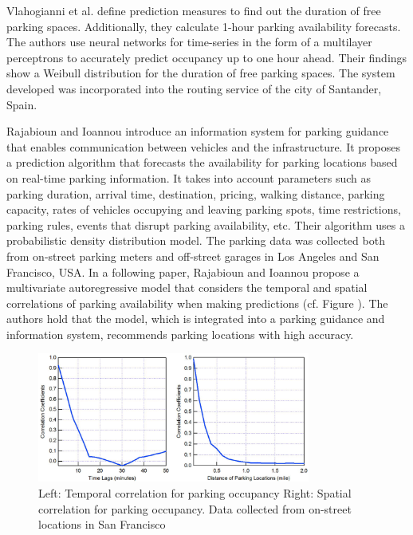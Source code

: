 Vlahogianni et al. \cite{vlahogianni} define prediction measures to find out the duration of free parking spaces. Additionally, they calculate 1-hour parking availability forecasts. The authors use neural networks for time-series in the form of a multilayer perceptrons to accurately predict occupancy up to one hour ahead. Their findings show a Weibull distribution for the duration of free parking spaces. The system developed was incorporated into the routing service of the city of Santander, Spain.

Rajabioun and Ioannou \cite{rajabioun2013} introduce an information system for parking guidance that enables communication between vehicles and the infrastructure. It proposes a prediction algorithm that forecasts the availability for parking locations based on real-time parking information. It takes into account parameters such as parking duration, arrival time, destination, pricing, walking distance, parking capacity, rates of vehicles occupying and leaving parking spots, time restrictions, parking rules, events that disrupt parking availability, etc. Their algorithm uses a probabilistic density distribution model. The parking data was collected both from on-street parking meters and off-street garages in Los Angeles and San Francisco, USA. In a following paper, Rajabioun and Ioannou \cite{rajabioun2015} propose a multivariate autoregressive model that considers the temporal and spatial correlations of parking availability when making predictions (cf. Figure ). The authors hold that the model, which is integrated into a parking guidance and information system, recommends parking locations with high accuracy. 

\begin{figure}[!ht]
	\centering
	\includegraphics[width=0.8\textwidth]{graphics/related_work/rajabioun_1.png}
	\caption{Left: Temporal correlation for parking occupancy Right: Spatial correlation for parking occupancy. Data collected from on-street locations in San Francisco} %
	\label{fig:related_work_rajabioun}
\end{figure}

